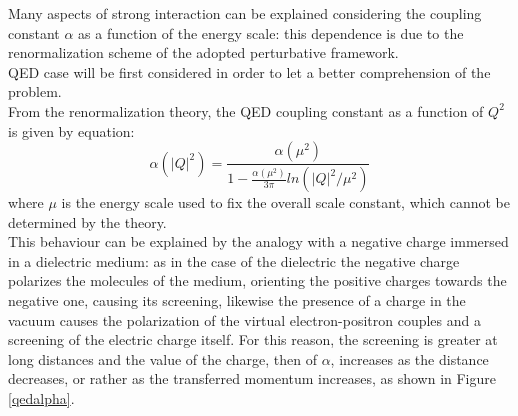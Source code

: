 Many aspects of strong interaction can be explained considering the coupling constant $\alpha$ as a function of the energy scale: this dependence is due to the renormalization scheme of the adopted perturbative framework.\\
QED case will be first considered in order to let a better comprehension of the problem.\\
From the renormalization theory, the QED coupling constant as a function of $Q^{2}$ is given by equation:
%
\begin{equation}
  \alpha(|Q|^{2})= \frac{ \alpha(\mu^{2})}{1-\frac{\alpha(\mu^{2})}{3\pi}ln(|Q|^{2} / \mu^{2})}
  \label{eq:aqed}
\end{equation}
%
where $\mu$ is the energy scale used to fix the overall scale constant, which cannot be determined by the theory.\\
This behaviour can be explained by the analogy with a negative charge immersed in a dielectric medium: as in the case of the dielectric the negative charge polarizes the molecules of the medium, orienting the positive charges towards the negative one, causing its screening, likewise the presence of a charge in the vacuum causes the polarization of the virtual electron-positron couples and a screening of the electric charge itself. For this reason, the screening is greater at long distances and the value of the charge, then of $\alpha$, increases as the distance decreases, or rather as the transferred momentum increases, as shown in Figure \ref{qedalpha}.
%
